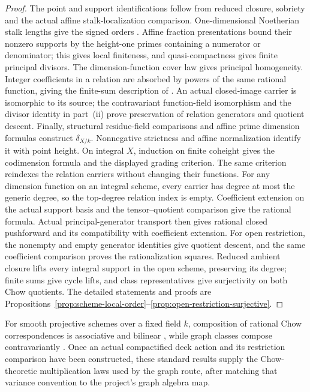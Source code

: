 \documentclass[11pt]{article}
\theoremstyle{definition}
\theoremstyle{remark}
\begin{document}
\begin{proof}
The point and support identifications follow from reduced closure,
sobriety and the actual affine stalk-localization comparison.
One-dimensional Noetherian stalk lengths give the signed orders
\cite{StacksLocalOrderOfVanishing,StacksCodimensionStalkDimension}.
Affine fraction presentations bound their nonzero supports by the
height-one primes containing a numerator or denominator; this gives
local finiteness, and quasi-compactness gives finite principal divisors.
The dimension-function cover law gives principal homogeneity.
Integer coefficients in a relation are absorbed by powers of the
same rational function, giving the finite-sum description of
\cite{StacksRationalEquivalence}.
An actual closed-image carrier is isomorphic to its source; the
contravariant function-field isomorphism and the divisor identity in
part~(ii) prove preservation of relation generators and quotient descent.
Finally, structural residue-field comparisons and affine prime
dimension formulas construct \(\delta_{X/k}\).
Nonnegative strictness and affine normalization identify it with
point height. On integral \(X\), induction on finite coheight gives
the codimension formula and the displayed grading criterion.
The same criterion reindexes the relation carriers without changing
their functions. For any dimension function on an integral scheme,
every carrier has degree at most the generic degree, so the
top-degree relation index is empty.
Coefficient extension on the actual support basis and the
tensor--quotient comparison give the rational formula.
Actual principal-generator transport then gives rational closed
pushforward and its compatibility with coefficient extension.
For open restriction, the nonempty and empty generator identities
give quotient descent, and the same coefficient comparison proves
the rationalization squares.
Reduced ambient closure lifts every integral support in the open
scheme, preserving its degree; finite sums give cycle lifts, and
class representatives give surjectivity on both Chow quotients.
The detailed statements and proofs are
Propositions~\ref{prop:scheme-local-order}--\ref{prop:open-restriction-surjective}.
\end{proof}

For smooth projective schemes over a fixed field \(k\), composition of rational Chow
correspondences is associative and bilinear
\cite{StacksChowCorrespondenceComposition}, while graph classes compose
contravariantly \cite{StacksChowGraphFunctor}.  Once an actual compactified
deck action and its restriction comparison have been constructed, these
standard results supply the Chow-theoretic multiplication laws used by the
graph route, after matching that variance convention to the project's graph
algebra map.
\end{document}
